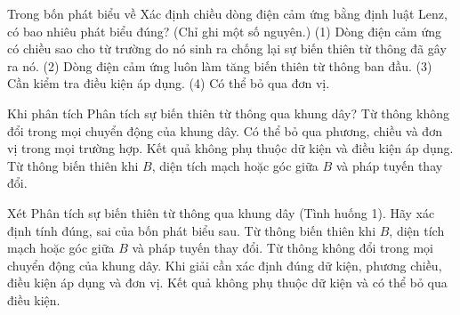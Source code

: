 \begin{ex}
Trong bốn phát biểu về Xác định chiều dòng điện cảm ứng bằng định luật Lenz, có bao nhiêu phát biểu đúng? (Chỉ ghi một số nguyên.) (1) Dòng điện cảm ứng có chiều sao cho từ trường do nó sinh ra chống lại sự biến thiên từ thông đã gây ra nó. (2) Dòng điện cảm ứng luôn làm tăng biến thiên từ thông ban đầu. (3) Cần kiểm tra điều kiện áp dụng. (4) Có thể bỏ qua đơn vị.
\end{ex}

\begin{ex}
Khi phân tích Phân tích sự biến thiên từ thông qua khung dây?
\choice
{Từ thông không đổi trong mọi chuyển động của khung dây.}
{Có thể bỏ qua phương, chiều và đơn vị trong mọi trường hợp.}
{Kết quả không phụ thuộc dữ kiện và điều kiện áp dụng.}
{\True Từ thông biến thiên khi $B$, diện tích mạch hoặc góc giữa $B$ và pháp tuyến thay đổi.}
\end{ex}

\begin{ex}
Xét Phân tích sự biến thiên từ thông qua khung dây (Tình huống 1). Hãy xác định tính đúng, sai của bốn phát biểu sau.
\choiceTF
{\True Từ thông biến thiên khi $B$, diện tích mạch hoặc góc giữa $B$ và pháp tuyến thay đổi.}
{Từ thông không đổi trong mọi chuyển động của khung dây.}
{\True Khi giải cần xác định đúng dữ kiện, phương chiều, điều kiện áp dụng và đơn vị.}
{Kết quả không phụ thuộc dữ kiện và có thể bỏ qua điều kiện.}
\end{ex}

